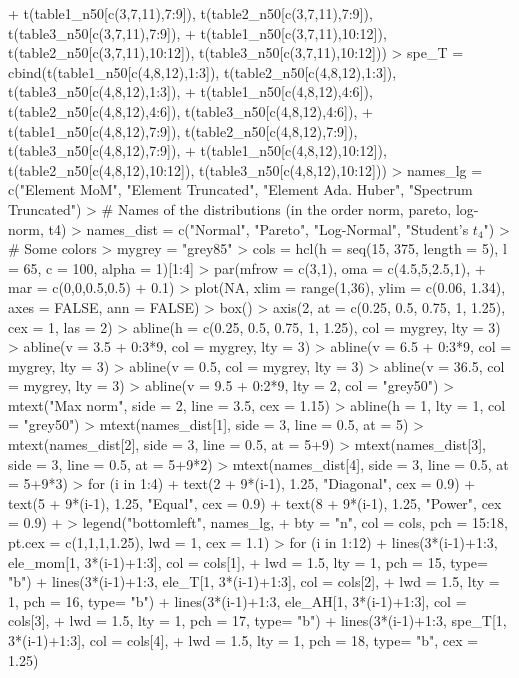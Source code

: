 \documentclass{article}
\begin{document}
\begin{Schunk}
\begin{Sinput}
+                t(table1_n50[c(3,7,11),7:9]), t(table2_n50[c(3,7,11),7:9]), t(table3_n50[c(3,7,11),7:9]),
+                t(table1_n50[c(3,7,11),10:12]), t(table2_n50[c(3,7,11),10:12]), t(table3_n50[c(3,7,11),10:12]))
> spe_T = cbind(t(table1_n50[c(4,8,12),1:3]), t(table2_n50[c(4,8,12),1:3]), t(table3_n50[c(4,8,12),1:3]),
+               t(table1_n50[c(4,8,12),4:6]), t(table2_n50[c(4,8,12),4:6]), t(table3_n50[c(4,8,12),4:6]),
+               t(table1_n50[c(4,8,12),7:9]), t(table2_n50[c(4,8,12),7:9]), t(table3_n50[c(4,8,12),7:9]),
+               t(table1_n50[c(4,8,12),10:12]), t(table2_n50[c(4,8,12),10:12]), t(table3_n50[c(4,8,12),10:12]))
> names_lg = c("Element MoM", "Element Truncated", "Element Ada. Huber", "Spectrum Truncated")
> # Names of the distributions (in the order norm, pareto, log-norm, t4)
> names_dist = c("Normal", "Pareto", "Log-Normal", "Student's $t_4$")
> # Some colors
> mygrey = "grey85"
> cols = hcl(h = seq(15, 375, length = 5), l = 65, c = 100, alpha = 1)[1:4]
> par(mfrow = c(3,1), oma = c(4.5,5,2.5,1),
+     mar = c(0,0,0.5,0.5) + 0.1)
> plot(NA, xlim = range(1,36), ylim = c(0.06, 1.34), axes = FALSE, ann = FALSE)
> box()
> axis(2, at = c(0.25, 0.5, 0.75, 1, 1.25), cex = 1, las = 2)
> abline(h = c(0.25, 0.5, 0.75, 1, 1.25), col = mygrey, lty = 3)
> abline(v = 3.5 + 0:3*9, col = mygrey, lty = 3)
> abline(v = 6.5 + 0:3*9, col = mygrey, lty = 3)
> abline(v = 0.5, col = mygrey, lty = 3)
> abline(v = 36.5, col = mygrey, lty = 3)
> abline(v = 9.5 + 0:2*9, lty = 2, col = "grey50")
> mtext("Max norm", side = 2, line = 3.5, cex = 1.15)
> abline(h = 1, lty = 1, col = "grey50")
> mtext(names_dist[1], side = 3, line = 0.5, at = 5)
> mtext(names_dist[2], side = 3, line = 0.5, at = 5+9)
> mtext(names_dist[3], side = 3, line = 0.5, at = 5+9*2)
> mtext(names_dist[4], side = 3, line = 0.5, at = 5+9*3)
> for (i in 1:4){
+   text(2 + 9*(i-1), 1.25, "Diagonal", cex = 0.9)
+   text(5 + 9*(i-1), 1.25, "Equal", cex = 0.9)
+   text(8 + 9*(i-1), 1.25, "Power", cex = 0.9)
+ }
> legend("bottomleft", names_lg,
+        bty = "n", col = cols, pch = 15:18, pt.cex = c(1,1,1,1.25), lwd = 1, cex = 1.1)
> for (i in 1:12){
+   lines(3*(i-1)+1:3, ele_mom[1, 3*(i-1)+1:3], col = cols[1],
+         lwd = 1.5, lty = 1, pch = 15, type= "b")
+   lines(3*(i-1)+1:3, ele_T[1, 3*(i-1)+1:3], col = cols[2],
+         lwd = 1.5, lty = 1, pch = 16, type= "b")
+   lines(3*(i-1)+1:3, ele_AH[1, 3*(i-1)+1:3], col = cols[3],
+         lwd = 1.5, lty = 1, pch = 17, type= "b")
+   lines(3*(i-1)+1:3, spe_T[1, 3*(i-1)+1:3], col = cols[4],
+         lwd = 1.5, lty = 1, pch = 18, type= "b", cex = 1.25)
}
\end{Sinput}
\end{Schunk}
\end{document}
